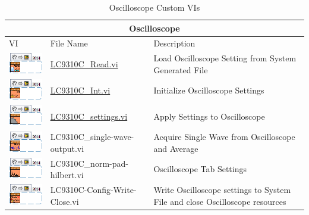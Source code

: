 \documentclass[11pt,a4paper,oldfontcommands]{memoir}
\begin{document}
\begin{table}[H]
	\centering
	\begin{tabular}{ m{2.5cm} | m{5cm} | m{5cm} }
		\hline
		\hline \multicolumn{3}{c}{Oscilloscope} \\ \hline \hline
		VI & File Name & Description \\ \hline
		\includegraphics[scale=0.625]{LC931C_Read_main} & \hyperref[fig:LC9310C_Read_main]{LC9310C\_Read.vi} & Load Oscilloscope Setting from System Generated File \\ \hline
		\includegraphics[scale=0.625]{LC931C_Int_main_02} & \hyperref[fig:LC9310C_Int_main_02]{LC9310C\_Int.vi} & Initialize Oscilloscope Settings \\ \hline
		\includegraphics[scale=0.625]{LC931C_settings_main_01} & \hyperref[fig:LC9310C_settings_main_01]{LC9310C\_settings.vi} & Apply Settings to Oscilloscope \\ \hline
		\includegraphics[scale=0.625]{LC931C_single-wave-output_main_01} & LC9310C\_single-wave-output.vi & Acquire Single Wave from Oscilloscope and Average \\ \hline
		\includegraphics[scale=0.625]{LC931C_norm-pad-hilbert_main_01} & LC9310C\_norm-pad-hilbert.vi & Oscilloscope Tab Settings \\ \hline
		\includegraphics[scale=0.625]{LC931C-Config-Write-Close_main_01} & LC9310C-Config-Write-Close.vi & Write Oscilloscope settings to System File and close Oscilloscope resources \\ \hline
	\end{tabular}
	\caption{Oscilloscope Custom VIs}
	\label{tab:osc}
\end{table}
\end{document}

